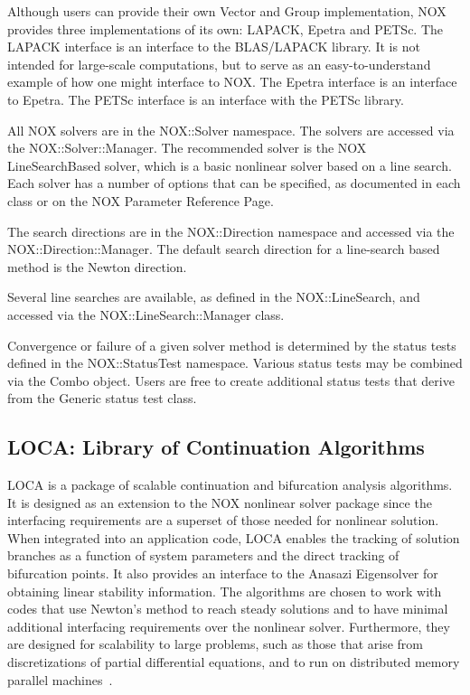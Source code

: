 \documentclass[12pt,relax]{TrilinosOverview}
\begin{document}
Although users can provide their own Vector and Group implementation,
NOX provides three implementations of its own: LAPACK, Epetra and
PETSc.  The LAPACK interface is an interface to the BLAS/LAPACK
library. It is not intended for large-scale computations, but to serve
as an easy-to-understand example of how one might interface to
NOX. The Epetra interface is an interface to Epetra.  The PETSc
interface is an interface with the PETSc library.

All NOX solvers are in the NOX::Solver namespace. The solvers are
accessed via the NOX::Solver::Manager. The recommended solver is the
NOX LineSearchBased solver, which is a basic nonlinear solver based on
a line search.  Each solver has a number of options that can be
specified, as documented in each class or on the NOX Parameter
Reference Page.

The search directions are in the NOX::Direction namespace and accessed
via the NOX::Direction::Manager. The default search direction for a
line-search based method is the Newton direction.
 
Several line searches are available, as defined in the
NOX::LineSearch, and accessed via the NOX::LineSearch::Manager
class.

Convergence or failure of a given solver method is determined by the
status tests defined in the NOX::StatusTest namespace. Various status
tests may be combined via the Combo object. Users are free to create
additional status tests that derive from the Generic status test
class.

\subsection{LOCA: Library of Continuation Algorithms}


LOCA is a package of scalable continuation and bifurcation analysis algorithms.
It is designed as an extension to the NOX nonlinear solver package since
the interfacing requirements are a superset of those needed for nonlinear solution.
When integrated into an application code, 
LOCA enables the tracking of solution branches as a function of system 
parameters and the direct tracking of bifurcation points. It also provides
an interface to the Anasazi Eigensolver for obtaining linear stability 
information.  The algorithms are chosen to work with codes that use
Newton's method to reach steady solutions and to have minimal 
additional interfacing requirements over the nonlinear solver.
Furthermore, they are designed for scalability to
large problems, such as those that arise from 
discretizations of partial differential equations, and to run on distributed
memory parallel machines~\cite{LOCA-MPSalsa-paper}.  
\end{document}
